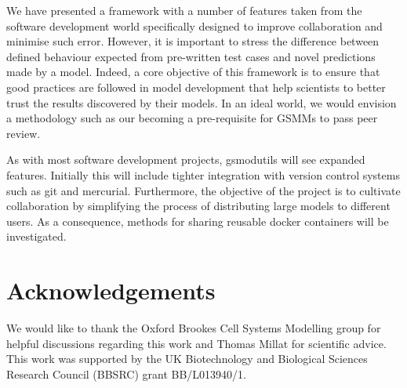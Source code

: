 \documentclass[a4paper,10pt]{article}
\begin{document}
We have presented a framework with a number of features taken from the software development world specifically designed to improve collaboration and minimise such error.
However, it is important to stress the difference between defined behaviour expected from pre-written test cases and novel predictions made by a model.
Indeed, a core objective of this framework is to ensure that good practices are followed in model development that help scientists to better trust the results discovered by their models.
In an ideal world, we would envision a methodology such as our becoming a pre-requisite for GSMMs to pass peer review.

As with most software development projects, gsmodutils will see expanded features.
Initially this will include tighter integration with version control systems such as git and mercurial.
Furthermore, the objective of the project is to cultivate collaboration by simplifying the process of distributing large models to different users.
As a consequence, methods for sharing reusable docker containers will be investigated.

\section*{Acknowledgements}
We would like to thank the Oxford Brookes Cell Systems Modelling group for helpful discussions regarding this work and Thomas Millat for scientific advice.
This work was supported by the UK Biotechnology and Biological Sciences Research Council (BBSRC) grant BB/L013940/1.




\end{document}
